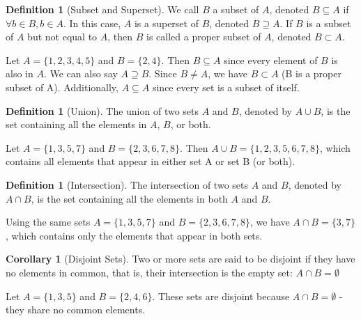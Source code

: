 \documentclass[12pt]{article}
\theoremstyle{definition}
\newtheorem{definition}[theorem]{Definition}
\newtheorem{corollary}[theorem]{Corollary}
\begin{document}
\vspace{12pt}


\begin{definition}[Subset and Superset]
    We call $B$ a subset of $A$, denoted $B \subseteq A$ if $\forall b \in B, b \in A$. In this case, $A$ is a superset of $B$, denoted $B \supseteq A$. If $B$ is a subset of $A$ but not equal to $A$, then $B$ is called a proper subset of $A$, denoted $B \subset A$.
\end{definition}


Let $A = \{1, 2, 3, 4, 5\}$ and $B = \{2, 4\}$. Then $B \subseteq A$ since every element of $B$ is also in $A$. We can also say $A \supseteq B$. Since $B \neq A$, we have $B \subset A$ (B is a proper subset of A). Additionally, $A \subseteq A$ since every set is a subset of itself.


\vspace{12pt}


\begin{definition}[Union]
    The union of two sets $A$ and $B$, denoted by $A \cup B$, is the set containing all the elements in $A$, $B$, or both. 
\end{definition}

Let $A = \{1, 3, 5, 7\}$ and $B = \{2, 3, 6, 7, 8\}$. Then $A \cup B = \{1, 2, 3, 5, 6, 7, 8\}$, which contains all elements that appear in either set A or set B (or both).



\vspace{12pt}


\begin{definition}[Intersection]
    The intersection of two sets $A$ and $B$, denoted by $A \cap B$, is the set containing all the elements in both $A$ and $B$.
\end{definition}


Using the same sets $A = \{1, 3, 5, 7\}$ and $B = \{2, 3, 6, 7, 8\}$, we have $A \cap B = \{3, 7\}$, which contains only the elements that appear in both sets.



\vspace{12pt}


\begin{corollary}[Disjoint Sets]
    Two or more sets are said to be disjoint if they have no elements in common, that is, their intersection is the empty set: $A \cap B = \emptyset$
\end{corollary}


Let $A = \{1, 3, 5\}$ and $B = \{2, 4, 6\}$. These sets are disjoint because $A \cap B = \emptyset$ - they share no common elements.
\end{document}
